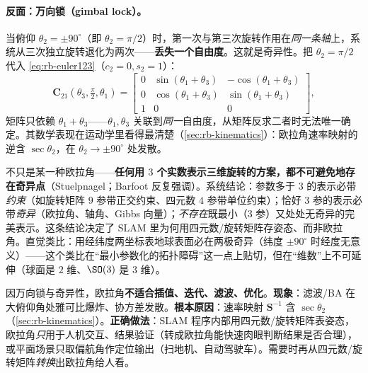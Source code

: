 \paragraph{反面：万向锁（gimbal lock）。}当俯仰 $\theta_2=\pm90^\circ$（即 $\theta_2=\pi/2$）时，第一次与第三次旋转作用在\emph{同一条轴}上，系统从三次独立旋转退化为两次——\textbf{丢失一个自由度}。这就是奇异性。把 $\theta_2=\pi/2$ 代入 \cref{eq:rb-euler123}（$c_2=0,s_2=1$）：
\begin{equation}
  \mathbf{C}_{21}(\theta_3,\tfrac{\pi}{2},\theta_1)=\begin{bmatrix}
  0&\sin(\theta_1+\theta_3)&-\cos(\theta_1+\theta_3)\\
  0&\cos(\theta_1+\theta_3)&\sin(\theta_1+\theta_3)\\
  1&0&0\end{bmatrix},
\end{equation}
矩阵只依赖 $\theta_1+\theta_3$——$\theta_1,\theta_3$ 关联到\emph{同一}自由度，从矩阵反求二者时无法唯一确定\cite{barfoot2024state}。其数学表现在运动学里看得最清楚（\cref{sec:rb-kinematics}）：欧拉角速率映射的逆含 $\sec\theta_2$，在 $\theta_2\to\pm90^\circ$ 处发散。

\begin{insight}
不只是某一种欧拉角——\textbf{任何用 $3$ 个实数表示三维旋转的方案，都不可避免地存在奇异点}（Stuelpnagel\cite{stuelpnagel1964parametrization}；Barfoot\cite{barfoot2024state} 反复强调）。系统结论：参数多于 $3$ 的表示必带\emph{约束}（如旋转矩阵 $9$ 参带正交约束、四元数 $4$ 参带单位约束）；恰好 $3$ 参的表示必带\emph{奇异}（欧拉角、轴角、Gibbs 向量）；\emph{不存在}既最小（$3$ 参）又处处无奇异的完美表示。这条结论决定了 SLAM 里为何用四元数/旋转矩阵存姿态、而非欧拉角。直觉类比：用经纬度两坐标表地球表面必在两极奇异（纬度 $\pm90^\circ$ 时经度无意义）——这个类比在“最小参数化的拓扑障碍”这一点上贴切，但在“维数”上不可延伸（球面是 $2$ 维、$\SO(3)$ 是 $3$ 维）。
\end{insight}

\begin{pitfall}
因万向锁与奇异性，欧拉角\textbf{不适合插值、迭代、滤波、优化}。\textbf{现象}：滤波/BA 在大俯仰角处雅可比爆炸、协方差发散。\textbf{根本原因}：速率映射 $\mathbf{S}^{-1}$ 含 $\sec\theta_2$（\cref{sec:rb-kinematics}）。\textbf{正确做法}：SLAM 程序内部用四元数/旋转矩阵表姿态，欧拉角\emph{只}用于人机交互、结果验证（转成欧拉角能快速肉眼判断结果是否合理），或平面场景只取偏航角作定位输出（扫地机、自动驾驶车）。需要时再从四元数/旋转矩阵\emph{转换}出欧拉角给人看。
\end{pitfall}

